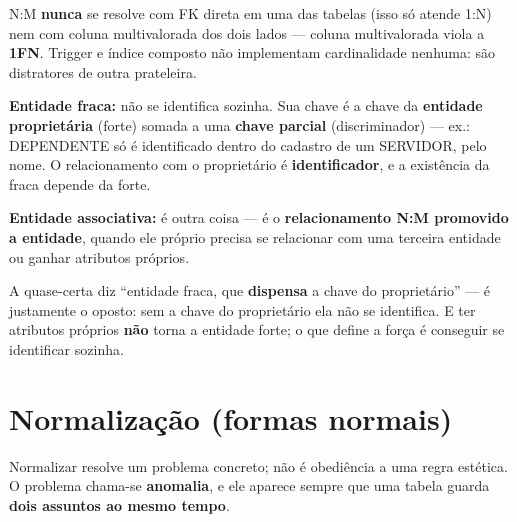 \begin{pegadinha}
N:M \textbf{nunca} se resolve com FK direta em uma das tabelas (isso só
atende 1:N) nem com coluna multivalorada dos dois lados --- coluna
multivalorada viola a \textbf{1FN}. Trigger e índice composto não implementam
cardinalidade nenhuma: são distratores de outra prateleira.
\end{pegadinha}

\begin{conceito}
\textbf{Entidade fraca:} não se identifica sozinha. Sua chave é a chave da
\textbf{entidade proprietária} (forte) somada a uma \textbf{chave parcial}
(discriminador) --- ex.: DEPENDENTE só é identificado dentro do cadastro de um
SERVIDOR, pelo nome. O relacionamento com o proprietário é
\textbf{identificador}, e a existência da fraca depende da forte.

\textbf{Entidade associativa:} é outra coisa --- é o \textbf{relacionamento
N:M promovido a entidade}, quando ele próprio precisa se relacionar com uma
terceira entidade ou ganhar atributos próprios.
\end{conceito}

\begin{pegadinha}
A quase-certa diz ``entidade fraca, que \textbf{dispensa} a chave do
proprietário'' --- é justamente o oposto: sem a chave do proprietário ela não
se identifica. E ter atributos próprios \textbf{não} torna a entidade forte; o
que define a força é conseguir se identificar sozinha.
\end{pegadinha}

\section{Normalização (formas normais)}

Normalizar resolve um problema concreto; não é obediência a uma regra
estética. O problema chama-se \textbf{anomalia}, e ele aparece sempre que uma
tabela guarda \textbf{dois assuntos ao mesmo tempo}.

